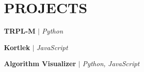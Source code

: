 \section{\textbf {\large PROJECTS}}
\resumeSubHeadingListStart %

    
    \resumeProjectHeading %
    {\textbf{TRPL-M} $|$ \emph{Python}}{}
    \resumeItemListStart %
        \resumeItem{}
        \resumeItem{}
        \resumeItem{}
    \resumeItemListEnd %

    \resumeProjectHeading %
    {\textbf{Kortlek} $|$ \emph{JavaScript}}{}
    \resumeItemListStart %
        \resumeItem{}
        \resumeItem{}
        \resumeItem{}
    \resumeItemListEnd %

    \resumeProjectHeading %
    {\textbf{Algorithm Visualizer} $|$ \emph{Python, JavaScript}}{}
    \resumeItemListStart %
        \resumeItem{}
        \resumeItem{}
        \resumeItem{}
    \resumeItemListEnd %

\resumeSubHeadingListEnd %